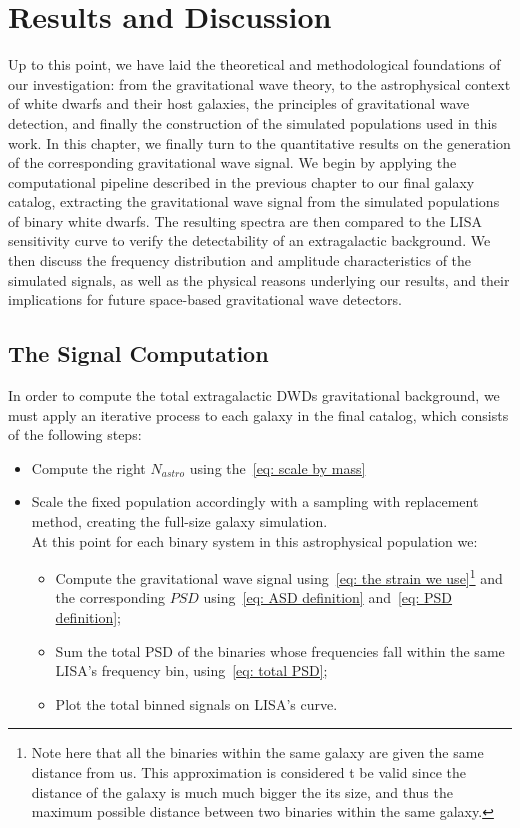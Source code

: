 \chapter{Results and Discussion}
Up to this point, we have laid the theoretical and methodological foundations of our investigation:  
from the gravitational wave theory, to the astrophysical context of white dwarfs and their host galaxies, the principles of gravitational wave detection, and finally the construction of the simulated populations used in this work.  
In this chapter, we finally turn to the quantitative results on the generation of the corresponding gravitational wave signal.  
We begin by applying the computational pipeline described in the previous chapter to our final galaxy catalog, extracting the gravitational wave signal from the simulated populations of binary white dwarfs.  
The resulting spectra are then compared to the LISA sensitivity curve to verify the detectability of an extragalactic background.  
We then discuss the frequency distribution and amplitude characteristics of the simulated signals, as well as the physical reasons underlying our results, and their implications for future space-based gravitational wave detectors.

\section{The Signal Computation}
In order to compute the total extragalactic DWDs gravitational background, we must apply an iterative process to each galaxy in the final catalog, which consists of the following steps:
\begin{itemize}
    \item Compute the right $N_{astro}$ using the~\eqref{eq: scale by mass}
    \item Scale the fixed population accordingly with a sampling with replacement method, creating the full-size galaxy simulation.
    \vspace{1.5mm}\\
    At this point for each binary system in this astrophysical population we:
    \begin{itemize}
        \item Compute the gravitational wave signal using~\eqref{eq: the strain we use}\footnote{Note here that all the binaries within the same galaxy are given the same distance from us. This approximation is considered t be valid since the distance of the galaxy is much much bigger the its size, and thus the maximum possible distance between two binaries within the same galaxy.} and the corresponding $PSD$ using~\eqref{eq: ASD definition} and~\eqref{eq: PSD definition};
        \item Sum the total PSD of the binaries whose frequencies fall within the same LISA's frequency bin, using~\eqref{eq: total PSD};
        \item Plot the total binned signals on LISA's curve.
    \end{itemize}
\end{itemize}
